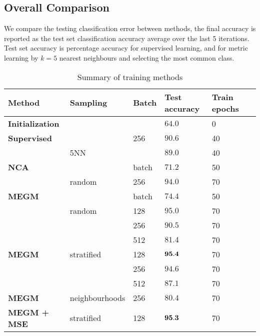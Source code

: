 \subsection{Overall Comparison}

We compare the testing classification error between methods, the final accuracy
is reported as the test set classification accuracy average over the last 5 iterations.
Test set accuracy is percentage accuracy for supervised learning, and for metric
learning by $k = 5$ nearest neighbours and selecting the most common class.




\begin{table*}[ht]

\centering
  \caption{Summary of training methods}

  \begin{tabular}{  l l  l  l l l }
  
    \toprule
    Method &  Sampling & Batch  & Test accuracy &  Train epochs \\  \hline
    \bf{Initialization} & &  &  $ 64.0  $ & 0  &  \\  
    \hline
    
    \bf{Supervised} & & 256 &  $ 90.6  $ & 40  &  \\  
     & 5NN  &  &  $ 89.0  $ & 40 &  \\  
     \hline
    
    \bf{NCA} &  & batch &  $  71.2  $ &  50  & \\
     & random & 256 & $  94.0  $ & 70 & \\
    
    \hline
    
    \bf{MEGM} &  & batch  &  $  74.4  $ &  50  & \\
     & random & 128 &  $  95.0  $ &  70  & \\     
     &  & 256 & $  90.5  $ &  70 & \\  
     &  & 512 & $  81.4  $ &  70 & \\
    
    \hline
    \bf{MEGM} & stratified & 128 & $  {\bf 95.4 }  $ & 70 & \\  
    
     &  & 256 & $  94.6  $ & 70 & \\  
     &  & 512 & $  87.1  $ & 70 & \\  

     \hline
     
    \bf{MEGM} & neighbourhoods & 256 & $  80.4  $ & 70  & \\
    
    \hline
    
    \bf{MEGM + MSE} & stratified & 128 & $  {\bf 95.3 }  $ & 70  & \\

      \bottomrule
    
    \end{tabular}
\label{fig:metric_summary}
\end{table*}



